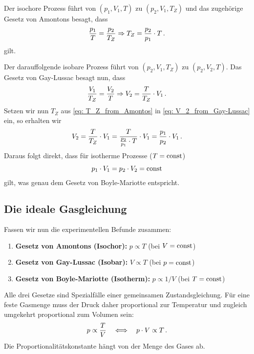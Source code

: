 Der isochore Prozess führt von $(p_1, V_1, T)$ zu $(p_2, V_1, T_Z)$ 
und das zugehörige Gesetz von Amontons besagt, dass 
\begin{equation}\label{eq: T_Z_from_Amontos}
    \frac{p_1}{T} = \frac{p_2}{T_Z} \Rightarrow T_Z = \frac{p_2}{p_1} \cdot T \,.
\end{equation} 
gilt. 

Der darauffolgende isobare Prozess führt von $(p_2, V_1, T_Z)$ zu $(p_2, V_2, T)$. Das Gesetz von Gay-Lussac besagt nun, dass
\begin{equation}\label{eq: V_2_from_Gay-Lussac}
    \frac{V_1}{T_Z} = \frac{V_2}{T} \Rightarrow V_2 = \frac{T}{T_Z} \cdot V_1 \,.
\end{equation}
Setzen wir nun $T_Z$ aus \cref{eq: T_Z_from_Amontos} in \cref{eq: V_2_from_Gay-Lussac} ein, so erhalten wir
\begin{equation}
    V_2 = \frac{T}{T_Z} \cdot V_1 = \frac{T}{\frac{p_2}{p_1} \cdot T} \cdot V_1 = \frac{p_1}{p_2} \cdot V_1 \,.
\end{equation}
Daraus folgt direkt, dass für isotherme Prozesse ($T = \mathrm{const}$) 
\begin{equation}
p_1 \cdot V_1 = p_2 \cdot V_2 = \mathrm{const}     
\end{equation}
gilt, was genau dem Gesetz von Boyle-Mariotte entspricht.

\subsection{Die ideale Gasgleichung}\label{subsec: ideale_gasgleichung}
Fassen wir nun die experimentellen Befunde zusammen:
\begin{enumerate}
    \item \textbf{Gesetz von Amontons (Isochor):} $p \propto T$ (bei $V=\mathrm{const}$)
    \item \textbf{Gesetz von Gay-Lussac (Isobar):} $V \propto T$ (bei $p=\mathrm{const}$)
    \item \textbf{Gesetz von Boyle-Mariotte (Isotherm):} $p \propto 1/V$ (bei $T=\mathrm{const}$)
\end{enumerate}
Alle drei Gesetze sind Spezialfälle einer gemeinsamen Zustandsgleichung. Für eine feste Gasmenge muss der Druck daher proportional zur Temperatur und zugleich umgekehrt proportional zum Volumen sein:
\begin{equation}\label{eq: Combine_Proportionalities _into_pvEqualsT}
    p \propto \frac{T}{V} \quad \Longleftrightarrow \quad p \cdot V \propto T \,.
\end{equation}
Die Proportionalitätskonstante hängt von der Menge des Gases ab.

